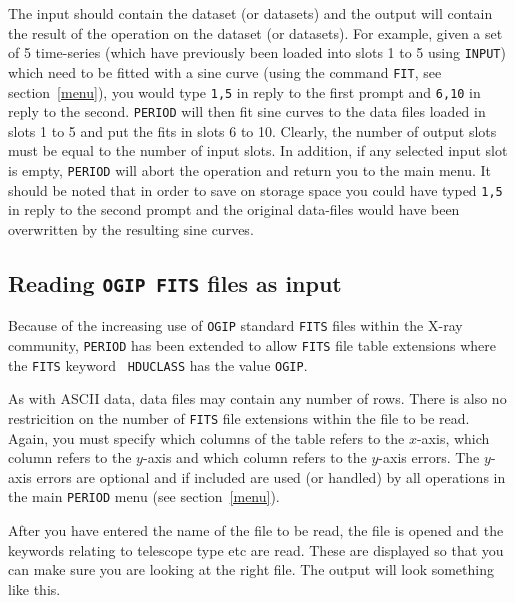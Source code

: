 The input should contain the dataset (or datasets) and the output will
contain the result of the operation on the dataset (or datasets). For
example, given a set of 5 time-series (which have previously been
loaded into slots 1 to 5 using {\tt INPUT}) which need to be fitted
with a sine curve (using the command {\tt FIT}, see
section~\ref{menu}), you would type {\tt 1,5} in reply to the first
prompt and {\tt 6,10} in reply to the second. {\tt PERIOD} will then
fit sine curves to the data files loaded in slots 1 to 5 and put the
fits in slots 6 to 10. Clearly, the number of output slots must be
equal to the number of input slots. In addition, if any selected input
slot is empty, {\tt PERIOD} will abort the operation and return you to
the main menu. It should be noted that in order to save on storage
space you could have typed {\tt 1,5} in reply to the second prompt and
the original data-files would have been overwritten by the resulting
sine curves.

\subsection{Reading {\tt OGIP FITS} files as input}
\label{slots2}

Because of the increasing use of {\tt OGIP} standard {\tt FITS} files
within the X-ray community, {\tt PERIOD} has been extended to allow
{\tt FITS} file table extensions where the {\tt FITS} keyword {\tt
HDUCLASS} has the value {\tt OGIP}.

As with ASCII data, data files may contain any number of rows. There is
also no restricition on the number of {\tt FITS} file extensions within
the file to be read.  Again, you must specify which columns of
the table refers to the $x$-axis, which column refers to the $y$-axis
and which column refers to the $y$-axis errors. The $y$-axis errors are
optional and if included are used (or handled) by all operations in the
main {\tt PERIOD} menu (see section~\ref{menu}).

After you have entered the name of the file to be read, the file is
opened and the keywords relating to telescope type etc are 
read. These are displayed so that you can make sure you are looking at 
the right file. The output will look something like this.

